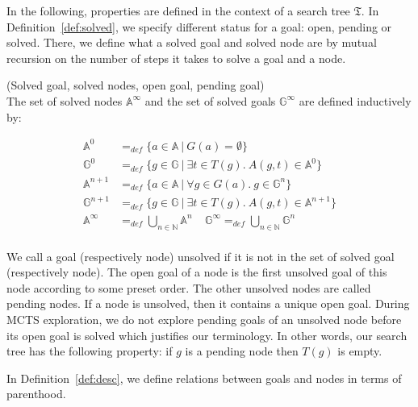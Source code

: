 \documentclass[runningheads,a4paper,draft]{svjour3}
\begin{document}
In the following, properties are defined in the context of a
search tree $\mathfrak{T}$. In Definition~\ref{def:solved}, we specify 
different status for a goal: open, pending or solved. There, we define 
what a solved goal and solved node are by mutual recursion on the number of
steps it takes to solve a goal and a node.
\begin{definition}\label{def:solved}(Solved goal, solved nodes, open goal,
pending goal)\\
The set of solved nodes $\mathbb{A}^\infty$ and
the set of solved goals $\mathbb{G}^\infty$ are defined inductively by:

\begin{align*}
\mathbb{A}^{0} &=_{def}
\lbrace a \in \mathbb{A}\ |\ G(a) = \emptyset \rbrace \\
\mathbb{G}^{0} &=_{def} \lbrace g \in \mathbb{G}\ |\
\exists t \in T(g).\ A(g,t) \in \mathbb{A}^{0} \rbrace\\
\mathbb{A}^{n+1} &=_{def} \lbrace a \in \mathbb{A}\ |\
\forall g \in G(a).\ g \in \mathbb{G}^{n} \rbrace\\
\mathbb{G}^{n+1} &=_{def} \lbrace g \in \mathbb{G}\ |\
\exists t \in T(g).\ A(g,t) \in \mathbb{A}^{n+1} \rbrace \\
\mathbb{A}^\infty &=_{def} \bigcup_{n \in \mathbb{N}} \mathbb{A}^n \ \ \ \ \
\mathbb{G}^\infty =_{def} \bigcup_{n \in \mathbb{N}} \mathbb{G}^n\\
\end{align*}

We call a goal (respectively node) unsolved if it is not in the set of solved  
goal (respectively node).
The open goal of a node is the first unsolved goal of this node according to 
some preset order. The other unsolved nodes are called pending nodes.
If a node is unsolved, then it contains a unique open goal.
During MCTS exploration, we do not explore pending goals of an unsolved node 
before its open goal is solved which justifies our terminology. In other words, 
our search tree has the following property: if $g$ is a pending node then 
$T(g)$ is empty.

\end{definition}


In Definition~\ref{def:desc}, we define relations between goals 
and nodes in terms of parenthood.
\end{document}
